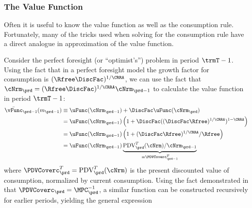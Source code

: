 \documentclass[titlepage, headings=optiontotocandhead]{econark}
\begin{document}


\hypertarget{the-value-function}{}
\subsubsection{The Value Function}



  Often it is useful to know the value function as well as the consumption rule.  Fortunately, many of the tricks used when solving for the consumption rule have a direct analogue in approximation of the value function.

  Consider the perfect foresight (or ``optimist's'') problem in period $\trmT-1$.  Using the fact that in a perfect foresight model the growth factor for consumption is $(\Rfree \DiscFac)^{1/\CRRA}$, we can use the fact that $\cNrm_{\prd} = (\Rfree \DiscFac)^{1/\CRRA} \cNrm_{\prd-1}$ to calculate the value function in period $\trmT-1$:
  \begin{equation*}\begin{gathered}\begin{aligned}
        \bar{\vFunc}_{\prd-1}(m_{\prd-1})  & \equiv  \uFunc(\cNrm_{\prd-1})+\DiscFac \uFunc(\cNrm_{\prd})
        \\  & = \uFunc(\cNrm_{\prd-1})\left(1+\DiscFac ((\DiscFac\Rfree)^{1/\CRRA})^{1-\CRRA}\right)
        \\  & = \uFunc(\cNrm_{\prd-1})\left(1+(\DiscFac\Rfree)^{1/\CRRA}/\Rfree\right)
        \\  & = \uFunc(\cNrm_{\prd-1})\underbrace{\mbox{PDV}_{\prd}^{T}(\cNrm)/\cNrm_{\prd-1}}_{\equiv \PDVCoverc_{\prd-1}^{T}}
      \end{aligned}\end{gathered}\end{equation*}
  where $\PDVCoverc_{\prd}^{T}=\mbox{PDV}_{\prd}^{T}(\cNrm)$ is the present discounted value of consumption, normalized by current consumption. Using the fact demonstrated in \cite{BufferStockTheory} that $\PDVCoverc_{\prd}=\MPC^{-1}_{\prd}$, a similar function can be constructed recursively for earlier periods, yielding the general expression \hypertarget{vFuncPF}{}

\end{document}
